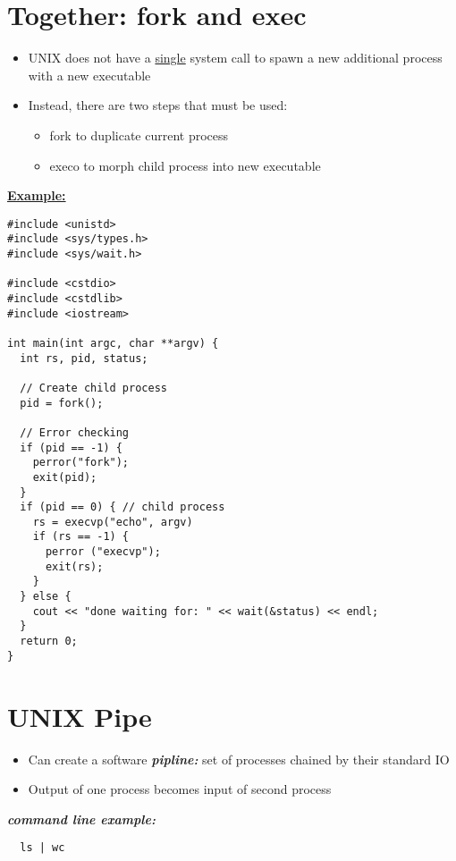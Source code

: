 \documentclass{report}
\begin{document}
\section{Together: fork and exec}
\begin{itemize}
  \item UNIX does not have a \underline{single} system call to spawn a new additional process with a new executable
  \item Instead, there are two steps that must be used:
    \begin{itemize}[label=$\circ$]
      \item fork to duplicate current process
      \item execo to morph child process into new executable
    \end{itemize}
\end{itemize}
\bigbreak \noindent
\textbf{\underline{Example:}}
\begin{verbatim}
#include <unistd>
#include <sys/types.h>
#include <sys/wait.h>

#include <cstdio>
#include <cstdlib>
#include <iostream>

int main(int argc, char **argv) {
  int rs, pid, status;

  // Create child process
  pid = fork();

  // Error checking
  if (pid == -1) {
    perror("fork");
    exit(pid);
  }
  if (pid == 0) { // child process
    rs = execvp("echo", argv)
    if (rs == -1) {
      perror ("execvp");
      exit(rs);
    }
  } else {
    cout << "done waiting for: " << wait(&status) << endl;
  }
  return 0;
}
\end{verbatim}
\section{UNIX Pipe}
\begin{itemize}
  \item Can create a software \textit{\textbf{pipline:}}
    \subitem set of processes chained by their standard IO
  \item Output of one process becomes input of second process
\end{itemize}
\bigbreak \noindent
\textbf{\textit{command line example:}}
\begin{verbatim}
  ls | wc
\end{verbatim}
\end{document}
